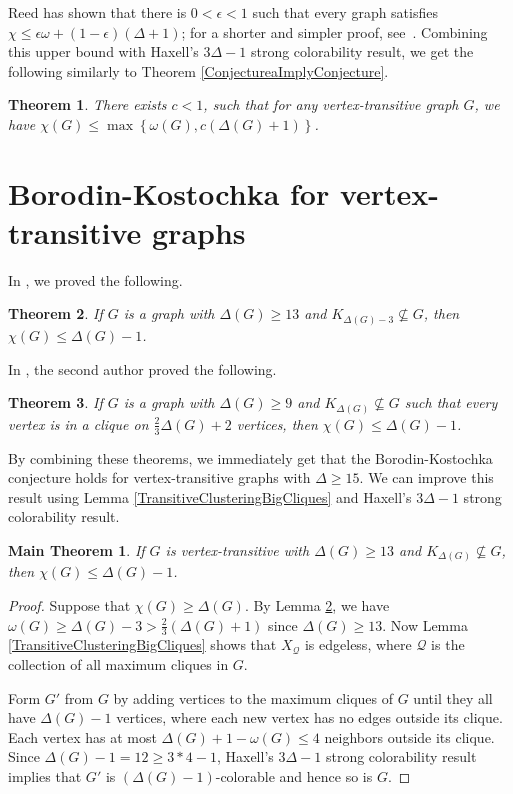 \documentclass[12pt]{article}
\theoremstyle{plain}
\newtheorem{thm}{Theorem}[section]
\newtheorem*{mainthm}{Main Theorem}
\theoremstyle{definition}
\theoremstyle{remark}
\newcommand{\fancy}[1]{\mathcal{#1}}
\newcommand{\set}[1]{\left\{ #1 \right\}}
\newcommand{\parens}[1]{\left( #1 \right)}
\def\Q{\fancy{Q}}
\begin{document}
Reed \cite{reed1998omega} has shown that there is $0 < \epsilon < 1$ such that
every graph satisfies $\chi \le \epsilon\omega + (1-\epsilon)(\Delta+1)$; for a
shorter and simpler proof, see~\cite{KingReed2012}.  Combining this upper bound
with Haxell's $3\Delta - 1$ strong colorability result, we get the following
similarly to Theorem \ref{ConjectureaImplyConjecture}.

\begin{thm}
There exists $c < 1$, such that for any vertex-transitive graph $G$, we have $\chi(G) \le \max \set{\omega(G), c(\Delta(G) + 1)}$.
\end{thm}

\section{Borodin-Kostochka for vertex-transitive graphs}
\label{BK}
In \cite{bigcliques}, we proved the following.
\begin{thm}\label{BigCliquesExist}
If $G$ is a graph with $\Delta(G) \ge 13$ and $K_{\Delta(G) - 3} \not \subseteq G$, then $\chi(G) \le \Delta(G) - 1$.
\end{thm} 

In \cite{denseneighborhoods}, the second author proved the following.
\begin{thm}\label{DenseNeighbors}
If $G$ is a graph with $\Delta(G) \ge 9$ and $K_{\Delta(G)} \not \subseteq G$ such that every vertex is in a clique on $\frac23 \Delta(G) + 2$ vertices, then $\chi(G) \le \Delta(G) - 1$.
\end{thm}

By combining these theorems, we immediately get that the Borodin-Kostochka
conjecture holds for vertex-transitive graphs with $\Delta \ge 15$.  We can
improve this result using Lemma \ref{TransitiveClusteringBigCliques} and
Haxell's $3\Delta - 1$ strong colorability result.

\begin{mainthm}\label{BKTransitive}
If $G$ is vertex-transitive with $\Delta(G) \ge 13$ and $K_{\Delta(G)} \not \subseteq G$, then $\chi(G) \le \Delta(G) - 1$.
\end{mainthm}
\begin{proof}
Suppose that $\chi(G)\ge \Delta(G)$.
By Lemma \ref{BigCliquesExist}, we have $\omega(G) \ge \Delta(G) - 3 > \frac23
(\Delta(G) + 1)$ since $\Delta(G) \ge 13$.  Now Lemma
\ref{TransitiveClusteringBigCliques} shows that $X_{\Q}$ is edgeless, where
$\Q$ is the collection of all maximum cliques in $G$.  

Form $G'$ from $G$ by adding vertices to the
maximum cliques of $G$ until they all have $\Delta(G) - 1$ vertices, where each
new vertex has no edges outside its clique.  Each vertex has at most $\Delta(G) + 1 - \omega(G) \le 4$ neighbors outside its clique.  Since $\Delta(G) - 1 = 12 \ge 3*4 - 1$, Haxell's $3\Delta - 1$ strong colorability result implies that $G'$ is $\parens{\Delta(G) - 1}$-colorable and hence so is $G$.
\end{proof}
\end{document}
